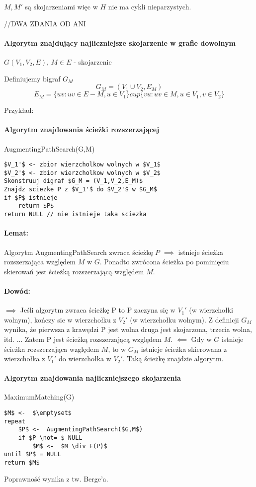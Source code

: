 $M,M'$ są skojarzeniami więc w $H$ nie ma cykli nieparzystych.

//DWA ZDANIA OD ANI

\paragraph{Algorytm znajdujący najliczniejsze skojarzenie w grafie dowolnym}

$G(V_1, V_2, E)$, $M \in E$ - skojarzenie

Definiujemy bigraf $G_M$
$$G_M = (V_1 \cup V_2, E_M)$$ 
$$E_M = \{uv : uv \in E-M, u \in V_1\} cup \{vu : uv \in M, u \in V_1, v \in V_2\}$$

Przykład:

\paragraph{Algorytm znajdowania ścieżki rozszerzającej}
AugmentingPathSearch(G,M)
\begin{lstlisting}
$V_1'$ <- zbior wierzcholkow wolnych w $V_1$
$V_2'$ <- zbior wierzcholkow wolnych w $V_2$
Skonstruuj digraf $G_M = (V_1,V_2,E_M)$
Znajdz sciezke P z $V_1'$ do $V_2'$ w $G_M$
if $P$ istnieje 
	return $P$
return NULL // nie istnieje taka sciezka
\end{lstlisting}

\paragraph{Lemat:} Algorytm AugmentingPathSearch zwraca ścieżkę $P$ $\implies$ istnieje ścieżka rozszerzająca względem $M$ w $G$. Ponadto zwrócona ścieżka po pominięciu skierowań jest ścieżką rozszerzającą względem $M$.

\paragraph{Dowód:} 
$\implies$ Jeśli algorytm zwraca ścieżkę P to P zaczyna się w $V_1'$ (w wierzchołki wolnym), kończy sie w wierzchołku z $V_2'$ (w wierzchołku wolnym). Z definicji $G_M$ wynika, że pierwsza z krawędzi P jest wolna druga jest skojarzona, trzecia wolna, itd.  ... Zatem P jest ścieżką rozszerzającą względem $M$.
$\impliedby$ Gdy w $G$ istnieje ścieżka rozszerzająca względem $M$, to w $G_M$ istnieje ścieżka skierowana z wierzchołka z $V_1'$ do wierzchołka w $V_2'$. Taką ścieżkę znajdzie algorytm.


\paragraph{Algorytm znajdowania najliczniejszego skojarzenia}
MaximumMatching(G)
\begin{lstlisting}
$M$ <-  $\emptyset$
repeat
	$P$ <-  AugmentingPathSearch($G,M$)
	if $P \not= $ NULL
		$M$ <-  $M \div E(P)$
until $P$ = NULL
return $M$
\end{lstlisting}
Poprawność wynika z tw. Berge'a.

